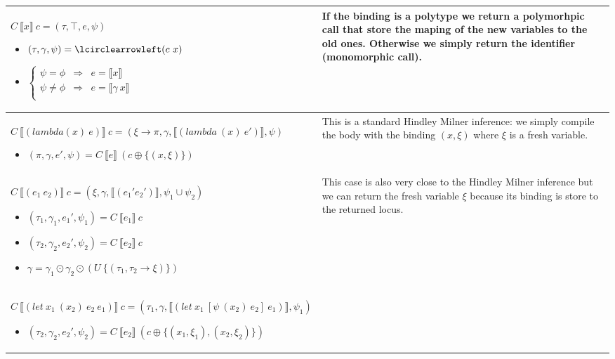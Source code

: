 \documentclass[a4paper]{report}
\newcommand{\inst}[0]{\lcirclearrowleft}
\begin{document}
\begin{table}
\centering
\begin{tabular}{|p{10cm}|p{5cm}|}
\hline
$C\ \llbracket x\rrbracket\ c=(\tau,\top,e,\psi)$
	\begin{itemize}
	\item $(\tau,\gamma,\psi)=\inst (c\ x)$
	\item $\left\{\begin{array}{ccl}
		\psi = \phi &\Rightarrow& e = \llbracket x\rrbracket\\
		\psi \neq \phi&\Rightarrow& e = \llbracket\gamma\ x\rrbracket\\
		\end{array}\right.$
	\end{itemize}&If the binding is a polytype we return a polymorhpic call that store the maping of the new variables to the old ones. Otherwise we simply return the identifier (monomorphic call).\\
\hline
$C\ \llbracket (lambda (x)\ e)\rrbracket\ c=(\xi\to\pi,\gamma,\llbracket(lambda\ (x)\ e')\rrbracket,\psi)$
	\begin{itemize}
	\item $(\pi,\gamma,e',\psi)=C\ \llbracket e \rrbracket\ (c\oplus\{(x,\xi)\})$
	\end{itemize}&This is a standard Hindley Milner inference: we simply compile the body with the binding $(x,\xi)$ where $\xi$ is a fresh variable.\\
\hline
$C\ \llbracket(e_1\ e_2)\rrbracket\ c=(\xi,\gamma,\llbracket(e_1' e_2')\rrbracket,\psi_1 \cup \psi_2)$
	\begin{itemize}
	\item $(\tau_1,\gamma_1,e_1',\psi_1)=C\ \llbracket e_1\rrbracket\ c$
	\item $(\tau_2,\gamma_2,e_2',\psi_2)=C\ \llbracket e_2\rrbracket\ c$
	\item $\gamma=\gamma_1\odot\gamma_2\odot (U\ \{(\tau_1,\tau_2\to \xi)\})$
	\end{itemize}&This case is also very close to the Hindley Milner inference but we can return the fresh variable $\xi$ because its binding is store to the returned locus.\\
\hline
$C\ \llbracket(let\ x_1\ (x_2)\ e_2\ e_1)\rrbracket\ c=(\tau_1,\gamma,\llbracket(let\ x_1\ [\psi\ (x_2)\ e_2]\ e_1)\rrbracket,\psi_1)$
	\begin{itemize}
	\item $(\tau_2,\gamma_2,e_2',\psi_2)=C\ \llbracket e_2\rrbracket\ (c \oplus \{(x_1,\xi_1),(x_2,\xi_2)\})$

\end{itemize}
\end{tabular}
\end{table}
\end{document}

